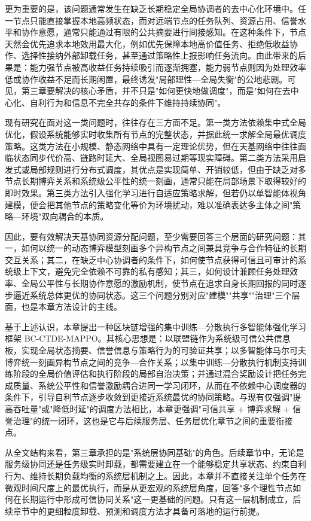 更为重要的是，该问题通常发生在缺乏长期稳定全局协调者的去中心化环境中。任一节点只能直接掌握本地高频状态，而对远端节点的任务队列、资源占用、信誉水平和协作意愿，通常只能通过有限的公共摘要进行间接感知。在这种条件下，节点天然会优先追求本地效用最大化，例如优先保障本地高价值任务、拒绝低收益协作、选择性接纳外部卸载任务，甚至通过策略性上报影响任务流向。由此带来的后果是：能力强节点被高收益任务持续吸引而逐渐拥塞，能力弱节点则因为处理效率低或协作收益不足而长期闲置，最终诱发"局部理性—全局失衡"的公地悲剧。可见，第三章要解决的核心矛盾，并不只是"如何更快地做调度"，而是"如何在去中心化、自利行为和信息不完全共存的条件下维持持续协同"。

现有研究在面对这一类问题时，往往存在三方面不足。第一类方法依赖集中式全局优化，假设系统能够实时收集所有节点的完整状态，并据此统一求解全局最优调度策略。这类方法在小规模、静态网络中具有一定理论优势，但在天基网络中往往面临状态同步代价高、链路时延大、全局视图易过期等现实障碍。第二类方法采用启发式或局部规则进行分布式调度，其优点是实现简单、开销较低，但由于缺乏对多节点长期博弈关系和系统级公平性的统一刻画，通常只能在局部场景下取得较好的即时效果。第三类方法引入强化学习进行自适应策略求解，但若仍以单智能体视角建模，便会把其他节点的策略变化等价为环境扰动，难以准确表达多主体之间"策略—环境"双向耦合的本质。

因此，要有效解决天基协同资源分配问题，至少需要回答三个层面的研究问题：其一，如何以统一的动态博弈模型刻画多个异构节点之间兼具竞争与合作特征的长期交互关系；其二，在缺乏中心协调者的条件下，如何使节点获得可信且可审计的系统级上下文，避免完全依赖不可靠的私有感知；其三，如何设计兼顾任务处理效率、全局公平性与长期协作意愿的激励机制，使节点在追求自身长期回报的同时逐步逼近系统总体更优的协同状态。这三个问题分别对应"建模""共享""治理"三个层面，也是本章方法设计的主线。

基于上述认识，本章提出一种区块链增强的集中训练—分散执行多智能体强化学习框架 BC-CTDE-MAPPO。其核心思想是：以联盟链作为系统级可信公共信息板，实现全局状态摘要、信誉信息与策略行为的可验证共享；以多智能体马尔可夫博弈统一刻画异构节点之间的竞争—合作关系；以集中训练—分散执行机制支持训练阶段的全局价值评估和执行阶段的局部自治决策；并通过混合奖励设计把任务完成质量、系统公平性和信誉激励耦合进同一学习闭环，从而在不依赖中心调度器的条件下，引导自利节点逐步收敛到更接近系统最优的协同策略。与现有仅强调"提高吞吐量"或"降低时延"的调度方法相比，本章更强调"可信共享 + 博弈求解 + 信誉治理"的统一闭环，这也是它与后续服务层、任务层优化章节之间的重要衔接点。

从全文结构来看，第三章承担的是"系统层协同基础"的角色。后续章节中，无论是服务级协同还是任务级实时卸载，都需要建立在一个能够稳定共享状态、约束自利行为、维持长期负载均衡的系统层机制之上。因此，本章并不直接关注单个任务在微观时间尺度上的最优执行，而是从更宏观的系统层角度，回答"多个理性节点如何在长期运行中形成可信协同关系"这一更基础的问题。只有这一层机制成立，后续章节中的更细粒度卸载、预测和调度方法才具备可落地的运行前提。

